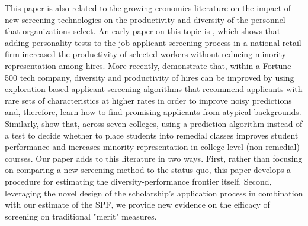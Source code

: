 This paper is also related to the growing economics literature on the impact of new screening technologies on the productivity and diversity of the personnel that organizations select. An early paper on this topic is \textcite{autor2008does}, which shows that adding personality tests to the job applicant screening process in a national retail firm increased the productivity of selected workers without reducing minority representation among hires. More recently, \textcite{li2020hiring} demonstrate that, within a Fortune 500 tech company, diversity and productivity of hires can be improved by using exploration-based applicant screening algorithms that recommend applicants with rare sets of characteristics at higher rates in order to improve noisy predictions and, therefore, learn how to find promising applicants from atypical backgrounds. Similarly, \textcite{bergman2021seven} show that, across seven colleges, using a prediction algorithm instead of a test to decide whether to place students into remedial classes improves student performance and increases minority representation in college-level (non-remedial) courses. Our paper adds to this literature in two ways. First, rather than focusing on comparing a new screening method to the status quo, this paper develops a procedure for estimating the diversity-performance frontier itself. Second, leveraging the novel design of the scholarship's application process in combination with our estimate of the SPF, we provide new evidence on the efficacy of screening on traditional "merit" measures. 

